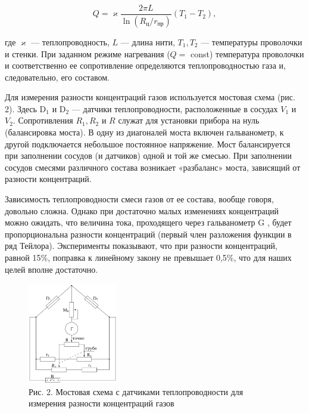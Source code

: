 \documentclass[a4paper,12pt]{article} %
\begin{document}
\begin{equation}
	Q = \varkappa\frac{2\pi L}{\ln{(R_{\text{ц}}/r_{\text{пр}})}}(T_{1} - T_{2}),
\end{equation}



\noindent где $\varkappa$ — теплопроводность, $L$ — длина нити, $T_{1}, T_{2}$ — температуры проволочки и стенки. При заданном режиме нагревания ($Q = $ const) температура проволочки и соответственно ее сопротивление определяются теплопроводностью газа и, следовательно, его составом.



Для измерения разности концентраций газов используется мостовая схема (рис. 2). Здесь D$_{1}$ и D$_{2}$ — датчики теплопроводности, расположенные в сосудах $V_{1}$ и $V_{2}$. Сопротивления $R_{1}, R_{2}$ и $R$ служат для установки прибора на нуль (балансировка моста). В одну из диагоналей моста включен гальванометр, к другой подключается небольшое постоянное напряжение. Мост балансируется при заполнении сосудов (и датчиков) одной и той же смесью. При заполнении сосудов смесями различного состава возникает «разбаланс» моста, зависящий от разности концентраций.


Зависимость теплопроводности смеси газов от ее состава, вообще говоря, довольно сложна. Однако при достаточно малых изменениях концентраций можно ожидать, что величина тока, проходящего через гальванометр G , будет пропорциональна разности концентраций (первый член разложения функции в ряд Тейлора). Эксперименты показывают, что при разности концентраций, равной 15\%, поправка к линейному закону не превышает 0,5\%, что для наших целей вполне достаточно.

\begin{figure}
	\includegraphics[width=0.35\textwidth]{Pictures/Рис2.png}
	\caption*{\footnotesize{Рис. 2. Мостовая схема с датчиками теплопроводности для измерения разности концентраций газов}}
\end{figure}
\end{document}
